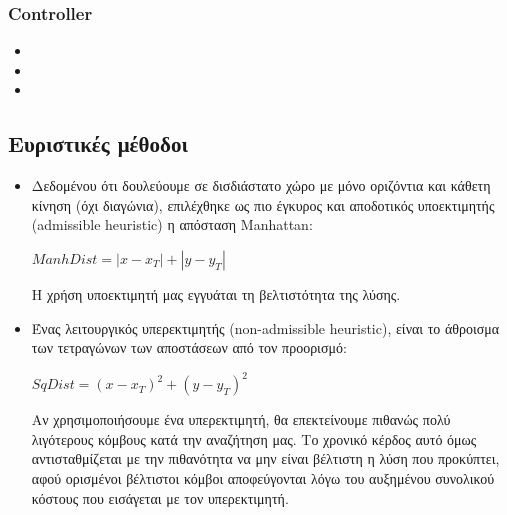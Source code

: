 \documentclass[a4paper,9pt]{article}
\begin{document}
\subsubsection{Controller}
\begin{itemize}
    \item
    \item
    \item
\end{itemize}


\subsection{Ευριστικές μέθοδοι}
\begin{itemize}
    \item
        Δεδομένου ότι δουλεύουμε σε δισδιάστατο χώρο με μόνο οριζόντια και κάθετη
        κίνηση (όχι διαγώνια), επιλέχθηκε ως πιο έγκυρος και αποδοτικός υποεκτιμητής
        (admissible heuris{\kern0pt}tic) η απόσταση Manhattan:
        \begin{center} $ManhDist = |x - x_T| + |y - y_T|$ \end{center}
        Η χρήση υποεκτιμητή μας εγγυάται τη βελτιστότητα της λύσης.

    \item
        Ένας λειτουργικός υπερεκτιμητής (non-admissible heuris{\kern0pt}tic), είναι το άθροισμα
        των τετραγώνων των αποστάσεων από τον προορισμό:
        \begin{center} $SqDist = (x - x_T)^2 + (y - y_T)^2$ \end{center}
        Αν χρησιμοποιήσουμε ένα υπερεκτιμητή, θα επεκτείνουμε πιθανώς πολύ λιγότερους
        κόμβους κατά την αναζήτηση μας. Το χρονικό κέρδος αυτό όμως αντισταθμίζεται με
        την πιθανότητα να μην είναι βέλτιστη η λύση που προκύπτει, αφού ορισμένοι
        βέλτιστοι κόμβοι αποφεύγονται λόγω του αυξημένου συνολικού κόστους που
        εισάγεται με τον υπερεκτιμητή.
\end{itemize}


\end{document}

